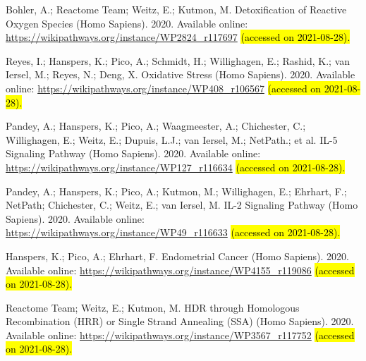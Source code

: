 \documentclass[ijms,article,accept,moreauthors,pdftex]{Definitions/mdpi}
\begin{document}
\begin{thebibliography}{999}
Bohler, A.; {Reactome Team}; Weitz, E.; Kutmon, M.
\newblock Detoxification of Reactive Oxygen Species (Homo Sapiens). 2020.
\newblock  Available online: \url{https://wikipathways.org/instance/WP2824_r117697} \hl{(accessed on 2021-08-28). } %

Reyes, I.; Hanspers, K.; Pico, A.; Schmidt, H.; Willighagen, E.; Rashid, K.;
  van Iersel, M.; Reyes, N.; Deng, X.
\newblock Oxidative Stress (Homo Sapiens). 2020.
\newblock Available online: \url{https://wikipathways.org/instance/WP408_r106567} \hl{(accessed on 2021-08-28). } %

Pandey, A.; Hanspers, K.; Pico, A.; Waagmeester, A.; Chichester, C.;
  Willighagen, E.; Weitz, E.; Dupuis, L.J.; van Iersel, M.; NetPath.; et al.
\newblock IL-5 Signaling Pathway (Homo Sapiens). 2020.
\newblock Available online: \url{https://wikipathways.org/instance/WP127_r116634} \hl{(accessed on 2021-08-28). } %

Pandey, A.; Hanspers, K.; Pico, A.; Kutmon, M.; Willighagen, E.; Ehrhart, F.;
  NetPath; Chichester, C.; Weitz, E.; van Iersel, M.
\newblock IL-2 Signaling Pathway (Homo Sapiens). 2020.
\newblock Available online: \url{https://wikipathways.org/instance/WP49_r116633} \hl{(accessed on 2021-08-28). } %

Hanspers, K.; Pico, A.; Ehrhart, F.
\newblock Endometrial Cancer (Homo Sapiens). 2020.
\newblock Available online: \url{https://wikipathways.org/instance/WP4155_r119086} \hl{(accessed on 2021-08-28). } %

{Reactome Team}; Weitz, E.; Kutmon, M.
\newblock HDR through Homologous Recombination (HRR) or Single Strand Annealing
  (SSA) (Homo Sapiens). 2020.
\newblock Available online: \url{https://wikipathways.org/instance/WP3567_r117752} \hl{(accessed on 2021-08-28). } %


\end{thebibliography}
\end{document}
